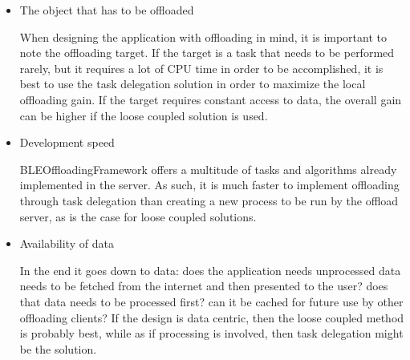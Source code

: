 \begin{itemize}

\item{The object that has to be offloaded}
	
	When designing the application with offloading in mind, it is important to note the offloading target. If the target is a task that needs to be performed rarely, but it requires a lot of CPU time in order to be accomplished, it is best to use the task delegation solution in order to maximize the local offloading gain. If the target requires constant access to data, the overall gain can be higher if the loose coupled solution is used.
	
\item{Development speed}

	BLEOffloadingFramework offers a multitude of tasks and algorithms already implemented in the server. As such, it is much faster to implement offloading through task delegation than creating a new process to be run by the offload server, as is the case for loose coupled solutions.

\item{Availability of data}

	In the end it goes down to data: does the application needs unprocessed data needs to be fetched from the internet and then presented to the user? does that data needs to be processed first? can it be cached for future use by other offloading clients? If the design is data centric, then the loose coupled method is probably best, while as if processing is involved, then task delegation might be the solution.

\end{itemize}